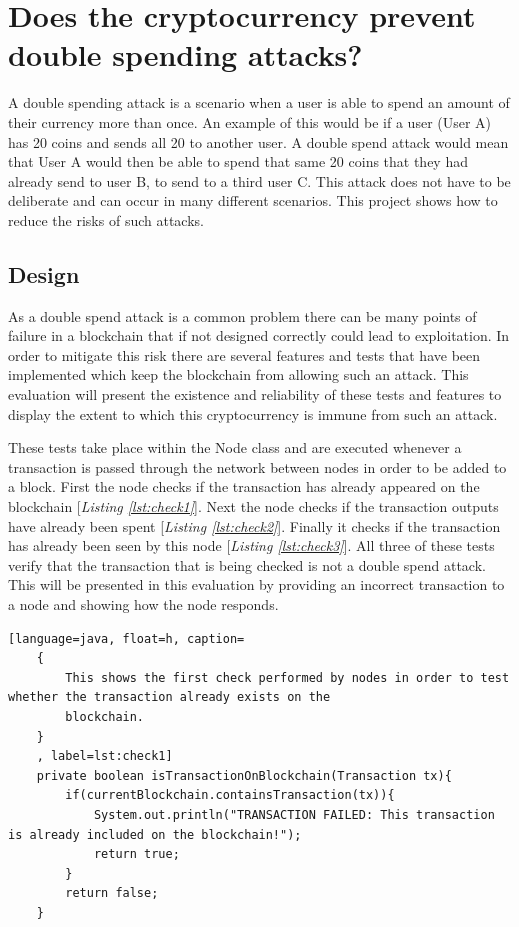 \documentclass{l4proj}
\begin{document}
\section{Does the cryptocurrency prevent double spending attacks?}
A double spending attack is a scenario when a user is able to spend an amount of their currency more than once. An example
of this would be if a user (User A) has 20 coins and sends all 20 to another user. A double spend attack would mean that User A would
then be able to spend that same 20 coins that they had already send to user B, to send to a third user C. This attack does not have
to be deliberate and can occur in many different scenarios. This project shows how to reduce the risks of such attacks.

\subsection{Design}
As a double spend attack is a common problem there can be many points of failure in a blockchain that if not designed
correctly could lead to exploitation. In order to mitigate this risk there are several features and tests that have been
implemented which keep the blockchain from allowing such an attack. This evaluation will present the existence and 
reliability of these tests and features to display the extent to which this cryptocurrency is immune from such an attack.

These tests take place within the Node class and are executed whenever a transaction is passed through the network
between nodes in order to be added to a block. First the node checks if the transaction has already appeared on the
blockchain [\textit{Listing \ref{lst:check1}}]. Next the node checks if the transaction outputs have already been spent [\textit{Listing \ref{lst:check2}}]. 
Finally it checks if the transaction has already been seen by this node [\textit{Listing \ref{lst:check3}}]. All three of these tests 
verify that the transaction that is being checked is not a double spend attack. This will be presented in this 
evaluation by providing an incorrect transaction to a node and showing how the node responds.

\begin{lstlisting}[language=java, float=h, caption=
    {
        This shows the first check performed by nodes in order to test whether the transaction already exists on the
        blockchain.
    }
    , label=lst:check1]
    private boolean isTransactionOnBlockchain(Transaction tx){
        if(currentBlockchain.containsTransaction(tx)){
            System.out.println("TRANSACTION FAILED: This transaction is already included on the blockchain!");
            return true;
        }
        return false;
    }
\end{lstlisting}
\end{document}
